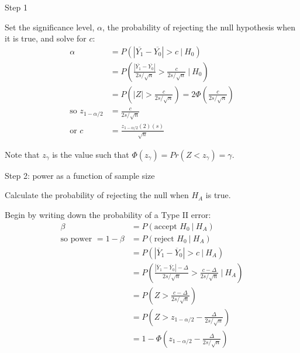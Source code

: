 \documentclass[ignorenonframetext,]{beamer}
\begin{document}
\begin{frame}{%
\protect\hypertarget{step-1}{%
Step 1}}

Set the significance level, \(\alpha\), the probability of rejecting the
null hypothesis when it is true, and solve for \(c\): \begin{align*}
\alpha &=  P\left(|\overline{Y_1} - 
\overline{Y_0}| > c ~|~ H_0\right)\\[1ex]
&=  P\left(\frac{|\overline{Y_1} - \overline{Y_0}|}{2s/\sqrt{n}} > 
\frac{c}{2s/\sqrt{n}} ~|~ H_0 \right) \\[1ex]
&= P\left(|Z| > \frac{c}{2s/\sqrt{n}}\right) = 
2  \Phi\left(\frac{c}{2s/\sqrt{n}}\right) \\[1ex]
\text{so } z_{1-\alpha/2} &=  \frac{c}{2s/\sqrt{n}}\\[2ex]
\text{or  } c &= \frac{z_{1-\alpha/2} (2)(s)}{\sqrt{n}}
\end{align*}

Note that \(z_{\gamma}\) is the value such that
\(\Phi(z_{\gamma})=Pr(Z<z_{\gamma}) = \gamma\).

\end{frame}

\begin{frame}{%
\protect\hypertarget{step-2-power-as-a-function-of-sample-size}{%
Step 2: power as a function of sample size}}

Calculate the probability of rejecting the null when \(H_A\) is true.

Begin by writing down the probability of a Type II error: \begin{align*}
\beta &= P\left(\text{accept $H_0$} ~|~ H_A\right)\\
\text{so power } =  1-\beta &=   P\left(\text{reject $H_0$} ~|~ H_A\right)\\
&=P\left(|\overline{Y}_1 - \overline{Y}_0| > c ~|~ H_A\right)\\
&= P\left(\frac{|\overline{Y}_1 - \overline{Y}_0| - \Delta}{2s/\sqrt{n}} > 
\frac{c-\Delta}{2s/\sqrt{n}} ~|~ H_A\right)\\
&= P\left(Z > \frac{c-\Delta}{2s/\sqrt{n}}\right)\\
&= P\left(Z > z_{1-\alpha/2} - \frac{\Delta}{2s/\sqrt{n}}\right) \\
&= 1 - \Phi\left(z_{1-\alpha/2} - \frac{\Delta}{2s/\sqrt{n}}\right)
\end{align*}

\end{frame}
\end{document}
